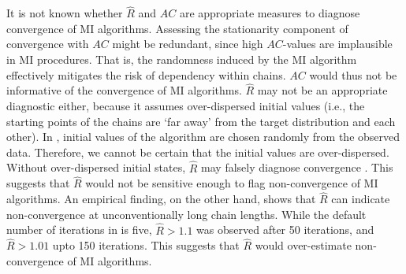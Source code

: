 \documentclass[article]{jss}
\begin{document}
It is not known whether $\widehat{R}$ and $AC$ are appropriate measures to diagnose convergence of MI algorithms. Assessing the stationarity component of convergence with $AC$ might be redundant, since high $AC$-values are implausible in MI procedures. That is, the randomness induced by the MI algorithm effectively mitigates the risk of dependency within chains. $AC$ would thus not be informative of the convergence of MI algorithms. $\widehat{R}$ may not be an appropriate diagnostic either, because it assumes over-dispersed initial values (i.e., the starting points of the chains are `far away' from the target distribution and each other). In , initial values of the algorithm are chosen randomly from the observed data. Therefore, we cannot be certain that the initial values are over-dispersed. %
Without over-dispersed initial states, $\widehat{R}$ may falsely diagnose convergence \citep{broo98}. %
This suggests that $\widehat{R}$ would not be sensitive enough to flag non-convergence of MI algorithms. An empirical finding, on the other hand, shows that $\widehat{R}$ can indicate non-convergence at unconventionally long chain lengths. While the default number of iterations in  is five, $\widehat{R} > 1.1$ was observed after 50 iterations, and $\widehat{R} > 1.01$ upto 150 iterations. This suggests that $\widehat{R}$ would over-estimate non-convergence of MI algorithms.  

% 
% 
% 
\end{document}
